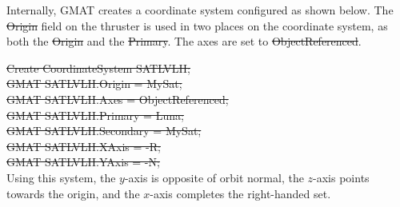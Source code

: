Internally, GMAT creates a coordinate system configured as shown
below.  The \st{Origin} field on the thruster is used in two places
on the coordinate system, as both the \st{Origin} and the
\st{Primary}.  The axes are set to  \st{ObjectReferenced}.

\noindent\st{ Create CoordinateSystem SATLVLH;}\\
\st{ GMAT SATLVLH.Origin = MySat; }\\
\st{ GMAT SATLVLH.Axes = ObjectReferenced;}\\
\st{ GMAT SATLVLH.Primary = Luna;}\\
\st{ GMAT SATLVLH.Secondary = MySat;}\\
\st{ GMAT SATLVLH.XAxis = -R; }\\
\st{ GMAT SATLVLH.YAxis = -N; }\\

Using this system, the $y$-axis is opposite of orbit normal, the
$z$-axis points towards the origin, and the $x$-axis completes the
right-handed set.


\newpage
%




